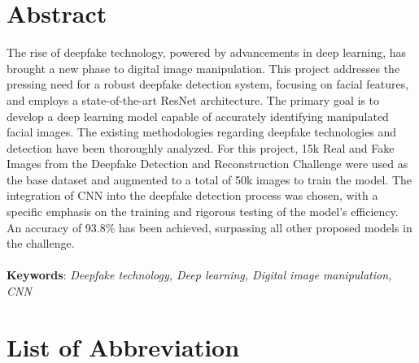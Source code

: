 \large
\chapter*{Abstract}
The rise of deepfake technology, powered by advancements in deep learning, has brought a new phase to digital image manipulation. This project addresses the pressing need for a robust deepfake detection system, focusing on facial features, and employs a state-of-the-art ResNet architecture. The primary goal is to develop a deep learning model capable of accurately identifying manipulated facial images. The existing methodologies regarding deepfake technologies and detection have been thoroughly analyzed. For this project, 15k Real and Fake Images from the Deepfake Detection and Reconstruction Challenge were used as the base dataset and augmented to a total of 50k images to train the model. The integration of CNN into the deepfake detection process was chosen, with a specific emphasis on the training and rigorous testing of the model’s efficiency. An accuracy of 93.8\% has been achieved, surpassing all other proposed models in the challenge.\\\\
\textbf{Keywords}: \textit{Deepfake technology, Deep learning, Digital image manipulation, CNN}
\pagebreak

\tableofcontents
\listoffigures
{}
\listoftables
{}
\pagebreak

\Large
\begingroup
\let\clearpage\relax
\chapter*{List of Abbreviation}
\endgroup
\normalsize
{}


